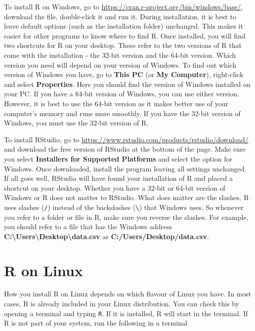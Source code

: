 \documentclass[
]{book}
\begin{document}
To install R on Windows, go to \url{https://cran.r-project.org/bin/windows/base/}, download the file, double-click it and run it. During installation, it is best to leave default options (such as the installation folder) unchanged. This makes it easier for other programs to know where to find R. Once installed, you will find two shortcuts for R on your desktop. These refer to the two versions of R that come with the installation - the 32-bit version and the 64-bit version. Which version you need will depend on your version of Windows. To find out which version of Windows you have, go to \textbf{This PC} (or \textbf{My Computer}), right-click and select \textbf{Properties}. Here you should find the version of Windows installed on your PC. If you have a 64-bit version of Windows, you can use either version. However, it is best to use the 64-bit version as it makes better use of your computer's memory and runs more smoothly. If you have the 32-bit version of Windows, you must use the 32-bit version of R.

To install RStudio, go to \url{https://www.rstudio.com/products/rstudio/download/} and download the free version of RStudio at the bottom of the page. Make sure you select \textbf{Installers for Supported Platforms} and select the option for Windows. Once downloaded, install the program leaving all settings unchanged. If all goes well, RStudio will have found your installation of R and placed a shortcut on your desktop. Whether you have a 32-bit or 64-bit version of Windows or R does not matter to RStudio. What does matter are the slashes. R uses slashes (\texttt{/}) instead of the backslashes (\texttt{\textbackslash{}}) that Windows uses. So whenever you refer to a folder or file in R, make sure you reverse the slashes. For example, you should refer to a file that has the Windows address \textbf{C:\textbackslash Users\textbackslash Desktop\textbackslash data.csv} as \textbf{C:/Users/Desktop/data.csv}.

\section{R on Linux}\label{r-on-linux}

How you install R on Linux depends on which flavour of Linux you have. In most cases, R is already included in your Linux distribution. You can check this by opening a terminal and typing \texttt{R}. If it is installed, R will start in the terminal. If R is not part of your system, run the following in a terminal
\end{document}
